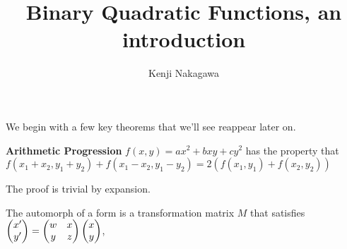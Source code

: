 \documentclass[11pt, oneside]{article}   	%
\title{Binary Quadratic Functions, an introduction}
\author{Kenji Nakagawa}
\begin{document}
\maketitle
We begin with a few key theorems that we'll see reappear later on.
\begin{theo} \textbf{Arithmetic Progression}
$f(x,y)=ax^2+bxy+cy^2$ has the property that $f(x_1+x_2,y_1+y_2)+f(x_1-x_2,y_1-y_2)=2(f(x_1,y_1)+f(x_2,y_2))$
\end{theo}
The proof is trivial by expansion.


The automorph of a form is a transformation matrix $M$ that satisfies $\left( \begin{matrix} {x'} \\ {y'} \end{matrix} \right)=\left( \begin{matrix} {w} & {x} \\ {y} & {z} \\ \end{matrix} \right) \left( \begin{matrix} {x} \\ {y} \end{matrix} \right)$,
\end{document}
